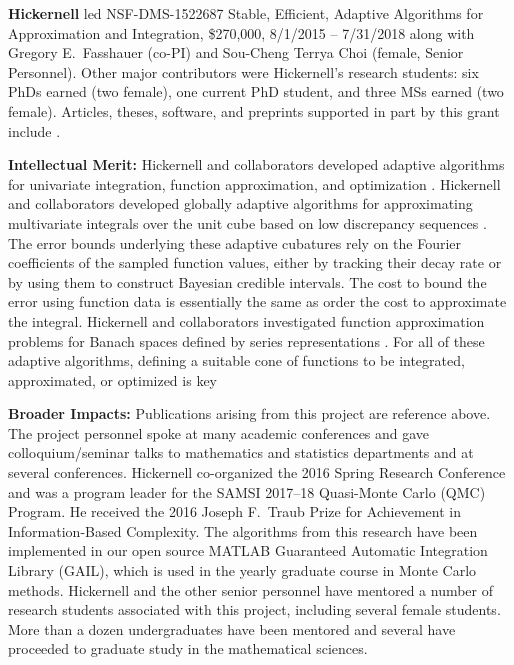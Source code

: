 \documentclass[11pt]{NSFamsart}
\begin{document}
 \medskip 
\noindent   \textbf{Hickernell} led NSF-DMS-1522687 Stable, Efficient, Adaptive Algorithms for Approximation and Integration,
		\$270,000, 8/1/2015 -- 7/31/2018 along with Gregory E.\ Fasshauer (co-PI) and  Sou-Cheng Terrya Choi (female, Senior Personnel).  Other major contributors were Hickernell's research students: 
		six PhDs earned (two female), one current PhD student, and three MSs earned (two female).
Articles, theses, software, and preprints supported in
part by this grant include
\cite{ala_augmented_2017,
	ChoEtal17a,
	ChoEtal20a,
	Din15a,
	DinHic20a,
	GilEtal16a,
	Hic17a,
	HicJag18b,
	HicJim16a,
	HicEtal18a,
	HicEtal17a,
	HicKriWoz19a,
	RatHic19a,
	GilJim16b,
	JimHic16a,
	JohFasHic18a,
	Li16a,
	Liu17a,
	MarEtal18a,
	mccourt_stable_2017,
	MCCEtal19a,
	mishra_hybrid_2018,
	MisEtal19a,
	rashidinia_stable_2016,
	rashidinia_stable_2018,
	Zha18a,
	Zha17a,
	Zho15a,
	ZhoHic15a}.

\noindent \textbf{Intellectual Merit:}
Hickernell and collaborators developed adaptive algorithms for univariate integration, function approximation, and optimization \cite{ChoEtal17a,HicEtal14b, Din15a, Ton14a, Zha18a}.
Hickernell and collaborators developed globally adaptive algorithms for approximating multivariate integrals over the unit cube based on low discrepancy sequences \cite{HicJim16a,HicEtal17a,JimHic16a,RatHic19a}.  The error bounds underlying these adaptive cubatures rely on the Fourier coefficients of the sampled function values, either by tracking their decay rate or by using them to construct Bayesian credible intervals. The cost to bound the error using function data is essentially the same as order the cost to approximate the integral. 
Hickernell and collaborators investigated function approximation problems for Banach spaces defined by series representations \cite{DinHic20a,DinEtal20a}.  For all of these adaptive algorithms, defining a suitable cone of functions to be integrated, approximated, or optimized is key

\noindent \textbf{Broader Impacts:}
Publications arising from this project are reference above.  
The project personnel spoke at many academic conferences and gave colloquium/seminar talks to mathematics and statistics departments and at several conferences.  Hickernell co-organized the 2016 Spring Research Conference and was a program leader for the SAMSI 2017--18 Quasi-Monte Carlo (QMC) Program.   He received the 2016 Joseph F.\ Traub Prize for Achievement in Information-Based Complexity. The algorithms from this research have been implemented in our open source MATLAB Guaranteed Automatic Integration Library (GAIL), which is used in the yearly graduate course in Monte Carlo methods.  Hickernell and the other senior personnel have mentored a number of research students associated with this project, including several female students.  More than a dozen undergraduates have been mentored and several have proceeded to graduate study in the mathematical sciences. 
\end{document}
